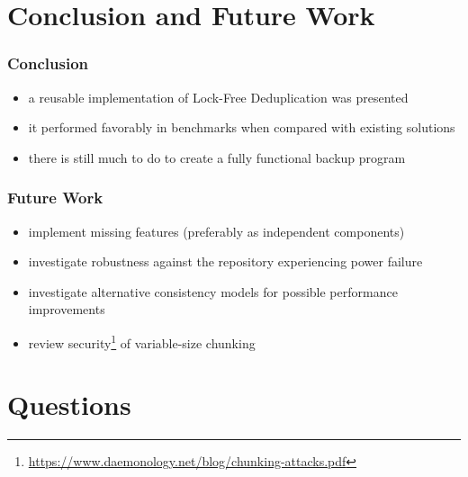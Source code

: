 \documentclass[english,utf8,aspectratio=169]{beamer}
\begin{document}
    \section{Conclusion and Future Work}
    \begin{frame}
        \frametitle{Conclusion}
        \begin{itemize}
            \item a reusable implementation of Lock-Free Deduplication was presented
            \item it performed favorably in benchmarks when compared with existing solutions
            \item there is still much to do to create a fully functional backup program
        \end{itemize}
    \end{frame}

    \begin{frame}
        \frametitle{Future Work}
        \begin{itemize}
            \item implement missing features (preferably as independent components)
            \item investigate robustness against the repository experiencing power failure
            \item investigate alternative consistency models for possible performance improvements
            \item review security\footnote{\url{https://www.daemonology.net/blog/chunking-attacks.pdf}}
                of variable-size chunking
        \end{itemize}
    \end{frame}
    
    \section{Questions}
\end{document}

